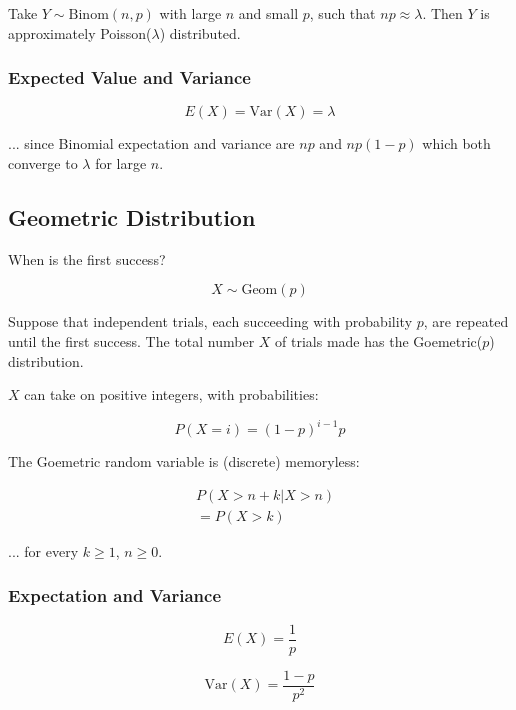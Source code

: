 Take $Y \sim \text{Binom}(n,p)$ with large $n$ and small $p$, such that $np \approx \lambda$. Then $Y$ is  approximately Poisson($\lambda$) distributed.

\subsubsection*{Expected Value and Variance}

$$ E(X) = \text{Var}(X) = \lambda $$

... since Binomial expectation and variance are $np$ and $np(1-p)$ which both converge to $\lambda$ for large $n$.

\subsection*{Geometric Distribution}

When is the first success?

$$ X \sim \text{Geom}(p) $$

Suppose that independent trials, each succeeding with probability $p$, are repeated until the first success. The total number $X$ of trials made has the Goemetric($p$) distribution.

$X$ can take on positive integers, with probabilities:

$$ P(X = i) = (1-p)^{i-1} p $$

The Goemetric random variable is (discrete) memoryless:

\begin{align*}
     & P(X > n + k | X > n) \\
     & = P(X > k)
\end{align*}

... for every $k \geq 1$, $n \geq 0$.

\subsubsection*{Expectation and Variance}

$$ E(X) = \frac{1}{p} $$

$$ \text{Var}(X) = \frac{1-p}{p^2} $$